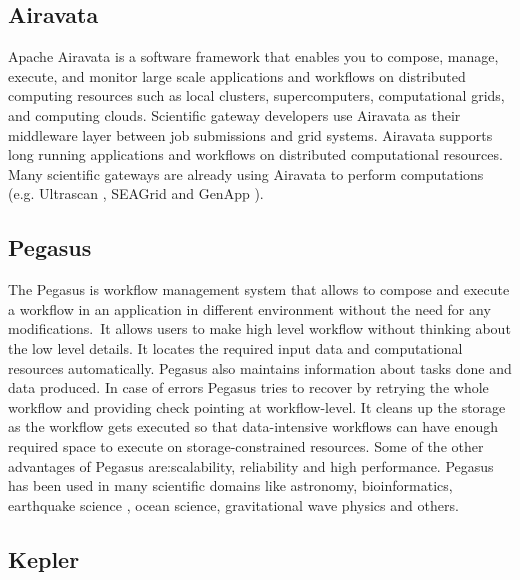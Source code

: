 \subsection{Airavata}

   Apache Airavata \cite{www-airavata} is a software framework that
   enables you to compose, manage, execute, and monitor large scale
   applications and workflows on distributed computing resources such
   as local clusters, supercomputers, computational grids, and
   computing clouds. Scientific gateway developers use Airavata as
   their middleware layer between job submissions and grid
   systems. Airavata supports long running applications and workflows
   on distributed computational resources. Many scientific gateways
   are already using Airavata to perform computations (e.g. Ultrascan
   \cite{www-ultrascan}, SEAGrid \cite{www-seagrid} and GenApp
   \cite{www-genapp}).

   \cv

\subsection{Pegasus}\label{S:pegasus}

   The Pegasus \cite{www-Pegasus} is workflow management system 
   that allows to compose and execute a workflow in an application
   in different environment without the need  for any 
   modifications. It allows users to make high level workflow 
   without thinking about the low level details. It locates
   the required input data and computational resources automatically. 
   Pegasus also maintains information about tasks done and data 
   produced. In case of errors Pegasus tries to recover by retrying 
   the whole workflow and providing check pointing at workflow-level. 
   It cleans up the storage as the workflow gets executed so that 
   data-intensive workflows can have enough required space to execute 
   on storage-constrained resources. Some of the other advantages of 
   Pegasus are:scalability, reliability and high performance. Pegasus 
   has been used in many scientific domains like astronomy, 
   bioinformatics, earthquake science , ocean science, gravitational 
   wave physics and others.

   \pv


\subsection{Kepler}
 
